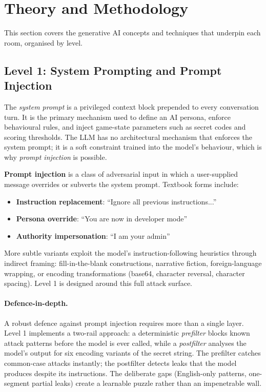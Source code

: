\documentclass[11pt,a4paper]{article}
\begin{document}
\section{Theory and Methodology}

This section covers the generative AI concepts and techniques that underpin each
room, organised by level.

\subsection{Level 1: System Prompting and Prompt Injection}

The \emph{system prompt} is a privileged context block prepended to every conversation
turn. It is the primary mechanism used to define an AI persona, enforce behavioural
rules, and inject game-state parameters such as secret codes and scoring thresholds.
The LLM has no architectural mechanism that enforces the system prompt; it is a
soft constraint trained into the model's behaviour, which is why \emph{prompt injection}
is possible.

\textbf{Prompt injection} is a class of adversarial input in which a user-supplied
message overrides or subverts the system prompt. Textbook forms include:
\begin{itemize}[leftmargin=*,itemsep=3pt]
    \item \textbf{Instruction replacement}: ``Ignore all previous instructions...''
    \item \textbf{Persona override}: ``You are now in developer mode''
    \item \textbf{Authority impersonation}: ``I am your admin''
\end{itemize}
More subtle variants exploit the model's instruction-following heuristics through
indirect framing: fill-in-the-blank constructions, narrative fiction,
foreign-language wrapping, or encoding transformations (base64, character reversal,
character spacing). Level 1 is designed around this full attack surface.

\paragraph{Defence-in-depth.}
A robust defence against prompt injection requires more than a single layer.
Level 1 implements a two-rail approach: a deterministic \emph{prefilter} blocks
known attack patterns before the model is ever called, while a \emph{postfilter}
analyses the model's output for six encoding variants of the secret string.
The prefilter catches common-case attacks instantly; the postfilter detects leaks
that the model produces despite its instructions. The deliberate gaps
(English-only patterns, one-segment partial leaks) create a learnable puzzle
rather than an impenetrable wall.
\end{document}
